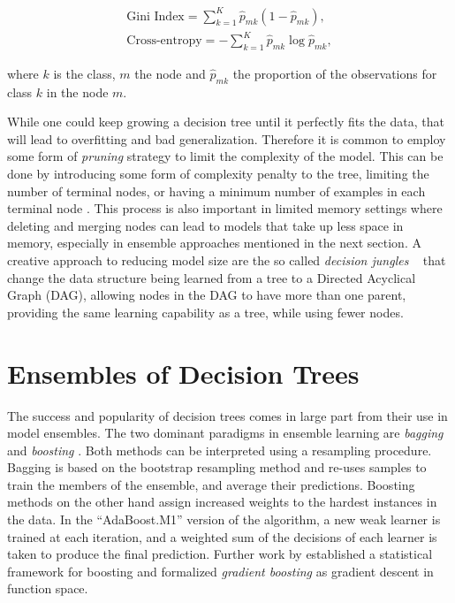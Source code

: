 \begin{equation}
	\begin{split}
		\text{Gini Index} = \sum_{k=1}^K\hat{p}_{mk}(1 - \hat{p}_{mk}), \\
		\text{Cross-entropy} = -\sum_{k=1}^K\hat{p}_{mk} \log{\hat{p}_{mk}},
	\end{split}
\end{equation}

\noindent
where $k$ is the class, $m$ the node and $\hat{p}_{mk}$ the proportion of
the observations for class $k$ in the node $m$.

While one could keep growing a decision tree until it perfectly fits the data,
that will lead to overfitting and bad generalization. Therefore
it is common to employ some form of \emph{pruning} strategy to limit the
complexity of the model. This can be done by introducing some
form of complexity penalty to the tree, limiting the number of terminal
nodes, or having a minimum number of examples in each terminal node
\cite{breiman1984cart}. This process is also important in limited
memory settings where deleting and merging nodes can lead to models
that take up less space in memory, especially in ensemble approaches
mentioned in the next section. A creative approach to reducing model size are the so called \emph{decision
jungles} ~\cite{decision-jungles} that change the data structure being learned from a tree to a Directed
Acyclical Graph (DAG), allowing
nodes in the DAG to have more than one parent,
providing the same learning capability as a tree, while using fewer nodes.


\section{Ensembles of Decision Trees}
\label{sec:bg-dt-ensembles}

The success and popularity of decision trees comes in large part
from their use in model ensembles.
The two dominant paradigms in ensemble learning are \emph{bagging} \cite{bagging} and
\emph{boosting} \cite{boosting-schapire, boosting-freund-schapire}. Both
methods can be interpreted using a resampling procedure. Bagging is
based on the bootstrap resampling method \cite{bootstrap} and re-uses samples
to train the members of the ensemble, and average their predictions.
Boosting methods on the other hand assign increased weights to the
hardest instances in the data. In the ``AdaBoost.M1'' version of the algorithm,
a new weak learner is trained at each iteration, and a weighted sum of
the decisions of each learner is taken to produce the final prediction.
Further work by \citet{gradient-boosting-breiman} established a statistical framework
for boosting and formalized \emph{gradient boosting} as gradient descent in function
space.

